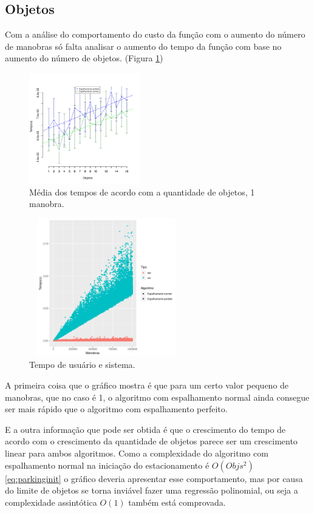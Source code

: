 \documentclass[11pt]{article}
\begin{document}
\subsection{Objetos}
\label{sec:org98e9be4}
Com a análise do comportamento do custo da função com o aumento do número de manobras só falta analisar o aumento do tempo da função com base no aumento do número de objetos. (Figura \ref{fig:means-data-total})

\begin{figure}[htbp]
\centering
\includegraphics[width=0.43\textwidth]{means-obj-data.png}
\caption{Média dos tempos de acordo com a quantidade de objetos, 1 manobra.\label{fig:means-data-total}}
\end{figure}

\begin{figure}[H]
\centering
\includegraphics[width=0.6\textwidth,height=6cm]{usr-sys-data-gg.png}
\caption{Tempo de usuário e sistema.\label{fig:usr-sys-data}}
\end{figure}

A primeira coisa que o gráfico mostra é que para um certo valor pequeno de manobras, que no caso é 1, o algoritmo com espalhamento normal ainda consegue ser mais rápido que o algoritmo com espalhamento perfeito. 

E a outra informação que pode ser obtida é que o crescimento do tempo de acordo com o crescimento da quantidade de objetos parece ser um crescimento linear para ambos algoritmos. Como a complexidade do algoritmo com espalhamento normal na iniciação do estacionamento é \(O(Objs^2)\) \eqref{eq:parkinginit} o gráfico deveria apresentar esse comportamento, mas por causa do limite de objetos se torna inviável fazer uma regressão polinomial, ou seja a complexidade assintótica \(O(1)\) também está comprovada.
\end{document}
